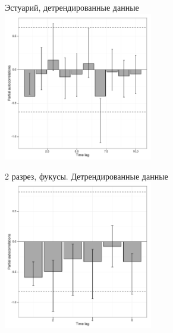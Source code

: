 \documentclass[12pt, a4paper]{disser}
\begin{document}
	\begin{figure}[ht]
	
	\begin{minipage}[b]{.46\linewidth}
	\begin{center}
	{\tiny Эстуарий, детрендированные данные}
		\includegraphics[width=65mm]{../White_Sea/dynamic_N_N1/boot_PRCF_Estuary_detrend.pdf}

	\end{center}
	\end{minipage}
	\hfil %
	\begin{minipage}[b]{.46\linewidth}
	\begin{center}
	{\tiny 2 разрез, фукусы. Детрендированные данные}
		\includegraphics[width=65mm]{../White_Sea/dynamic_N_N1/boot_PRCF_razrez2_fucus_zone_detrend.pdf}
	\end{center}
	\end{minipage}




\end{figure}
\end{document}
